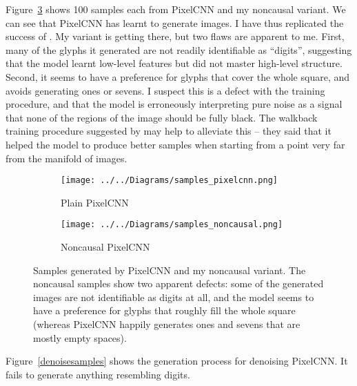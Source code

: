 \documentclass[11pt, a4paper, openany]{book}
\newcommand{\nquote}[1]{``{#1}''}
\begin{document}
Figure~\ref{samples} shows 100 samples each from PixelCNN and my noncausal variant. We can see that PixelCNN has learnt to generate images. I have thus replicated the success of \citet{pixelcnn1}. My variant is getting there, but two flaws are apparent to me. First, many of the glyphs it generated are not readily identifiable as \nquote{digits}, suggesting that the model learnt low-level features but did not master high-level structure. Second, it seems to have a preference for glyphs that cover the whole square, and avoids generating ones or sevens. I suspect this is a defect with the training procedure, and that the model is erroneously interpreting pure noise as a signal that none of the regions of the image should be fully black. The walkback training procedure suggested by \citet{denoisinggenerative} may help to alleviate this -- they said that it helped the model to produce better samples when starting from a point very far from the manifold of images.


\begin{figure}
  \centering    
    \begin{subfigure}{0.46\columnwidth}
        \centering
        \caption{Plain PixelCNN}
        \texttt{[image: ../../Diagrams/samples\_pixelcnn.png]} 
        \label{samples:pixelcnn}
    \end{subfigure}
    \hfill
    \begin{subfigure}{0.46\columnwidth}
        \centering
        \caption{Noncausal PixelCNN}
        \texttt{[image: ../../Diagrams/samples\_noncausal.png]} 
        \label{samples:noncausal}
    \end{subfigure}
  \caption[Generated samples]{Samples generated by PixelCNN and my noncausal variant. The noncausal samples show two apparent defects: some of the generated images are not identifiable as digits at all, and the model seems to have a preference for glyphs that roughly fill the whole square (whereas PixelCNN happily generates ones and sevens that are mostly empty spaces).}
  \label{samples}
\end{figure}

Figure~\ref{denoisesamples} shows the generation process for denoising PixelCNN. It fails to generate anything resembling digits.
\end{document}

